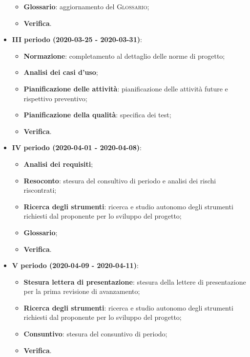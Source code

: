 \documentclass[../piano-di-progetto.tex]{subfiles}
\begin{document}
\begin{itemize}
\begin{itemize}
                \item \textbf{Glossario}: aggiornamento del \textsc{Glossario};
                \item \textbf{Verifica}.
            \end{itemize}
        \item \textbf{III periodo (2020-03-25 - 2020-03-31)}:
        \begin{itemize}
            \item \textbf{Normazione}: completamento al dettaglio delle norme di progetto;
            \item \textbf{Analisi dei casi d'uso};
            \item \textbf{Pianificazione delle attività}: pianificazione delle attività future e rispettivo preventivo;
            \item \textbf{Pianificazione della qualità}: specifica dei test;
            \item \textbf{Verifica}.
        \end{itemize}
        \item \textbf{IV periodo (2020-04-01 - 2020-04-08)}:
        \begin{itemize}
            \item \textbf{Analisi dei requisiti};
            \item \textbf{Resoconto}: stesura del consultivo di periodo e analisi dei rischi riscontrati;
            \item \textbf{Ricerca degli strumenti}: ricerca e studio autonomo degli strumenti richiesti dal proponente per lo sviluppo del progetto;
            \item \textbf{Glossario};
            \item \textbf{Verifica}.

        \end{itemize}

        \item \textbf{V periodo (2020-04-09 - 2020-04-11)}:
        \begin{itemize}
            \item \textbf{Stesura lettera di presentazione}: stesura della lettere di presentazione per la prima revisione di avanzamento;
            \item \textbf{Ricerca degli strumenti}: ricerca e studio autonomo degli strumenti richiesti dal proponente per lo sviluppo del progetto;
            \item \textbf{Consuntivo}: stesura del consuntivo di periodo;
            \item \textbf{Verifica}.
        \end{itemize}
    \end{itemize}
\end{document}
